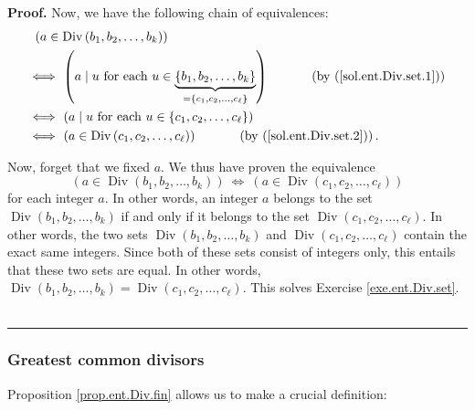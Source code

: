 \documentclass[numbers=enddot,12pt,final,onecolumn,notitlepage]{scrartcl}%
\numberwithin{exer}{subsection}
\theoremstyle{definition}
\newenvironment{fineprint}{\begin{small}}{\end{small}}
\newenvironment{proof}[1][Proof]{\noindent\textbf{#1.} }{\ \rule{0.5em}{0.5em}}
\begin{document}
\begin{fineprint}
\begin{proof}
Now, we have the following chain of equivalences:%
\begin{align*}
&  \ \left(  a\in\operatorname*{Div}\left(  b_{1},b_{2},\ldots,b_{k}\right)
\right) \\
&  \Longleftrightarrow\ \left(  a\mid u\text{ for each }u\in
\underbrace{\left\{  b_{1},b_{2},\ldots,b_{k}\right\}  }_{=\left\{
c_{1},c_{2},\ldots,c_{\ell}\right\}  }\right)  \ \ \ \ \ \ \ \ \ \ \left(
\text{by (\ref{sol.ent.Div.set.1})}\right) \\
&  \Longleftrightarrow\ \left(  a\mid u\text{ for each }u\in\left\{
c_{1},c_{2},\ldots,c_{\ell}\right\}  \right) \\
&  \Longleftrightarrow\ \left(  a\in\operatorname*{Div}\left(  c_{1}%
,c_{2},\ldots,c_{\ell}\right)  \right)  \ \ \ \ \ \ \ \ \ \ \left(  \text{by
(\ref{sol.ent.Div.set.2})}\right)  .
\end{align*}


Now, forget that we fixed $a$. We thus have proven the equivalence
\[
\left(  a\in\operatorname*{Div}\left(  b_{1},b_{2},\ldots,b_{k}\right)
\right)  \ \Longleftrightarrow\ \left(  a\in\operatorname*{Div}\left(
c_{1},c_{2},\ldots,c_{\ell}\right)  \right)
\]
for each integer $a$. In other words, an integer $a$ belongs to the set
$\operatorname*{Div}\left(  b_{1},b_{2},\ldots,b_{k}\right)  $ if and only if
it belongs to the set $\operatorname*{Div}\left(  c_{1},c_{2},\ldots,c_{\ell
}\right)  $. In other words, the two sets $\operatorname*{Div}\left(
b_{1},b_{2},\ldots,b_{k}\right)  $ and $\operatorname*{Div}\left(  c_{1}%
,c_{2},\ldots,c_{\ell}\right)  $ contain the exact same integers. Since both
of these sets consist of integers only, this entails that these two sets are
equal. In other words, $\operatorname*{Div}\left(  b_{1},b_{2},\ldots
,b_{k}\right)  =\operatorname*{Div}\left(  c_{1},c_{2},\ldots,c_{\ell}\right)
$. This solves Exercise \ref{exe.ent.Div.set}.
\end{proof}
\end{fineprint}

\subsubsection{Greatest common divisors}

Proposition \ref{prop.ent.Div.fin} allows us to make a crucial definition:
\end{document}
